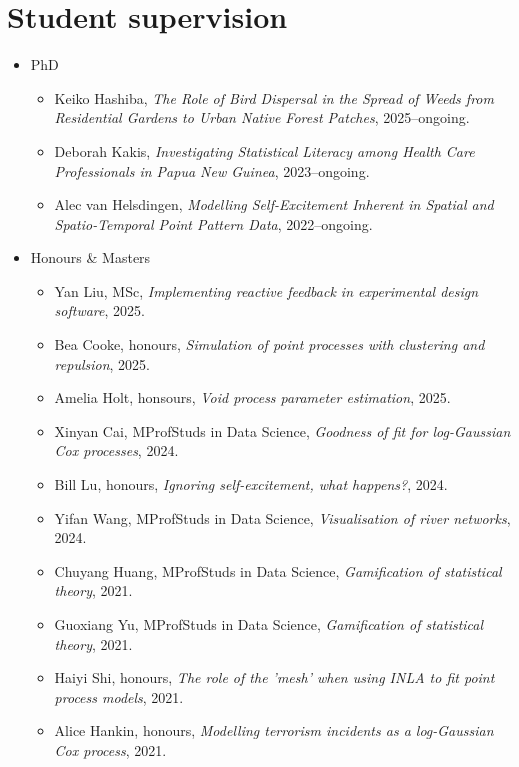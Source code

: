 \documentclass[10pt,a4paper]{moderncv}
\begin{document}
\newpage
\section{Student supervision}

\vspace{6pt}

\begin{itemize}
\item PhD
  \begin{itemize}
  \item Keiko Hashiba, \textit{The Role of Bird Dispersal in the Spread of Weeds from Residential Gardens to Urban Native Forest Patches}, 2025--ongoing.
  \item Deborah Kakis, \textit{Investigating Statistical Literacy among Health Care Professionals in Papua New Guinea}, 2023--ongoing.
  \item Alec van Helsdingen, \textit{Modelling Self-Excitement Inherent in Spatial and Spatio-Temporal Point Pattern Data}, 2022--ongoing.
  \end{itemize}
\item Honours \& Masters
  \begin{itemize}
  \item Yan Liu, MSc, \textit{Implementing reactive feedback in experimental design software}, 2025.
  \item Bea Cooke, honours, \textit{Simulation of point processes with clustering and repulsion}, 2025.
    \item Amelia Holt, honsours, \textit{Void process parameter estimation}, 2025.
  \item Xinyan Cai, MProfStuds in Data Science, \textit{Goodness of fit for log-Gaussian Cox processes}, 2024.
  \item Bill Lu, honours, \textit{Ignoring self-excitement, what happens?}, 2024.
  \item Yifan Wang, MProfStuds in Data Science, \textit{Visualisation of river networks}, 2024.
  \item Chuyang Huang, MProfStuds in Data Science, \textit{Gamification of statistical theory}, 2021.
  \item Guoxiang Yu, MProfStuds in Data Science, \textit{Gamification of statistical theory}, 2021.
  \item Haiyi Shi, honours, \textit{The role of the 'mesh' when using INLA to fit point process models}, 2021.
  \item Alice Hankin, honours, \textit{Modelling terrorism incidents as a log-Gaussian Cox process}, 2021.

\end{itemize}
\end{itemize}
\end{document}
